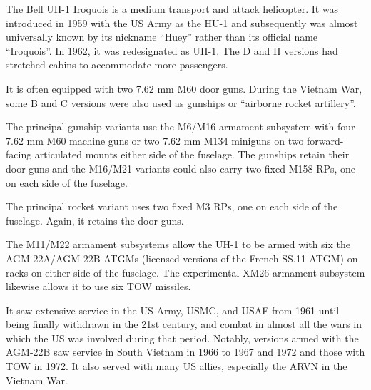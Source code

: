 

The Bell UH-1 Iroquois is a medium transport and attack helicopter. It was introduced in 1959 with the US Army as the HU-1 and subsequently was almost universally known by its nickname “Huey” rather than its official name “Iroquois”. In 1962, it was redesignated as UH-1. The D and H versions had stretched cabins to accommodate more passengers.

It is often equipped with two 7.62 mm M60 door guns. During the Vietnam War, some B and C versions were also used as gunships or “airborne rocket artillery”.

The principal gunship variants use the M6/M16 armament subsystem with four 7.62 mm M60 machine guns or two 7.62 mm M134 miniguns on two forward-facing articulated mounts either side of the fuselage. The gunships retain their door guns and the M16/M21 variants could also carry two fixed M158  RPs, one on each side of the fuselage.

The principal rocket variant uses two fixed M3  RPs, one on each side of the fuselage. Again, it retains the door guns.

The M11/M22 armament subsystems allow the UH-1 to be armed with six the AGM-22A/AGM-22B ATGMs (licensed versions of the French SS.11 ATGM) on racks on either side of the fuselage. The experimental XM26 armament subsystem likewise allows it to use six TOW missiles.

It saw extensive service in the US Army, USMC, and USAF from 1961 until being finally withdrawn in the 21st century, and combat in almost all the wars in which the US was involved during that period. Notably, versions armed with the AGM-22B saw service in South Vietnam in 1966 to 1967 and 1972 and those with TOW in 1972. It also served with many US allies, especially the ARVN in the Vietnam War.
